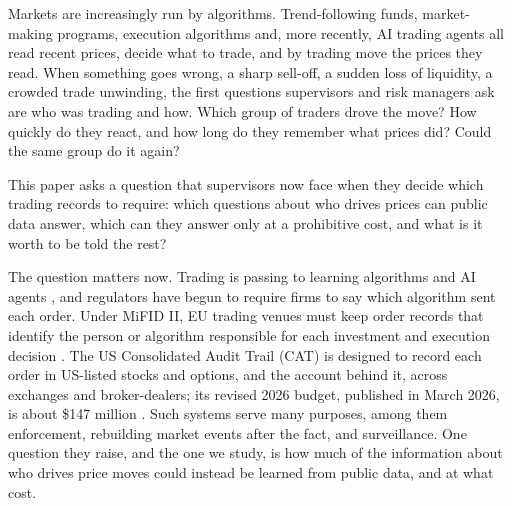 \documentclass[12pt]{article}
\theoremstyle{definition}
\theoremstyle{remark}
\begin{document}
Markets are increasingly run by algorithms. Trend-following funds, market-making programs, execution algorithms and, more recently, AI trading agents all read recent prices, decide what to trade, and by trading move the prices they read. When something goes wrong, a sharp sell-off, a sudden loss of liquidity, a crowded trade unwinding, the first questions supervisors and risk managers ask are who was trading and how. Which group of traders drove the move? How quickly do they react, and how long do they remember what prices did? Could the same group do it again?

This paper asks a question that supervisors now face when they decide which trading records to require: which questions about who drives prices can public data answer, which can they answer only at a prohibitive cost, and what is it worth to be told the rest?

The question matters now. Trading is passing to learning algorithms and AI agents \citep{colliard2022,dou2025}, and regulators have begun to require firms to say which algorithm sent each order. Under MiFID II, EU trading venues must keep order records that identify the person or algorithm responsible for each investment and execution decision \citep{rts24,esma2016}. The US Consolidated Audit Trail (CAT) is designed to record each order in US-listed stocks and options, and the account behind it, across exchanges and broker-dealers; its revised 2026 budget, published in March 2026, is about \$147 million \citep{sec2012,catbudget2026}. Such systems serve many purposes, among them enforcement, rebuilding market events after the fact, and surveillance. One question they raise, and the one we study, is how much of the information about who drives price moves could instead be learned from public data, and at what cost.
\end{document}

